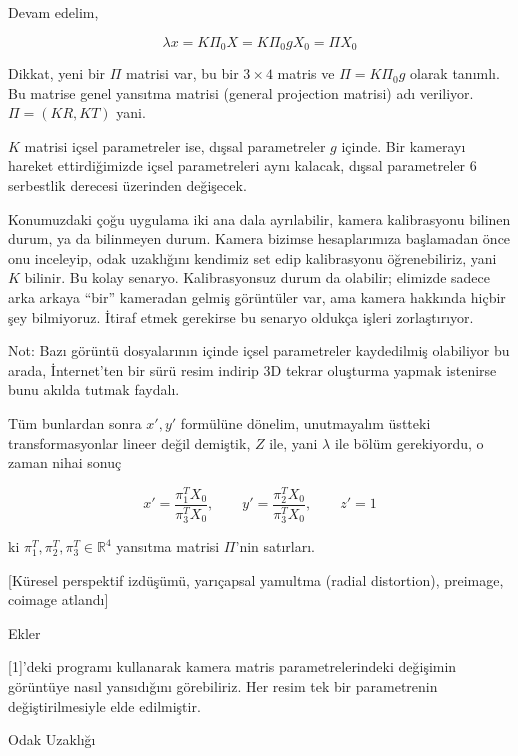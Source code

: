 \documentclass[12pt,fleqn]{article}\usepackage{../../common}
\begin{document}
Devam edelim,

$$ \lambda x = K\Pi_0 X = K \Pi_0 g X_0 = \Pi X_0 $$

Dikkat, yeni bir $\Pi$ matrisi var, bu bir $3 \times 4$ matris ve $\Pi =
K\Pi_0g$ olarak tanımlı. Bu matrise genel yansıtma matrisi (general projection
matrisi) adı veriliyor. $\Pi = (KR, KT)$ yani.

$K$ matrisi içsel parametreler ise, dışsal parametreler $g$ içinde. Bir
kamerayı hareket ettirdiğimizde içsel parametreleri aynı kalacak, dışsal
parametreler 6 serbestlik derecesi üzerinden değişecek.

Konumuzdaki çoğu uygulama iki ana dala ayrılabilir, kamera kalibrasyonu bilinen
durum, ya da bilinmeyen durum. Kamera bizimse hesaplarımıza başlamadan önce onu
inceleyip, odak uzaklığını kendimiz set edip kalibrasyonu öğrenebiliriz, yani
$K$ bilinir. Bu kolay senaryo. Kalibrasyonsuz durum da olabilir; elimizde sadece
arka arkaya ``bir'' kameradan gelmiş görüntüler var, ama kamera hakkında hiçbir
şey bilmiyoruz. İtiraf etmek gerekirse bu senaryo oldukça işleri zorlaştırıyor.

Not: Bazı görüntü dosyalarının içinde içsel parametreler kaydedilmiş
olabiliyor bu arada, İnternet'ten bir sürü resim indirip 3D tekrar
oluşturma yapmak istenirse bunu akılda tutmak faydalı.

Tüm bunlardan sonra $x',y'$ formülüne dönelim, unutmayalım üstteki
transformasyonlar lineer değil demiştik, $Z$ ile, yani $\lambda$ ile bölüm
gerekiyordu, o zaman nihai sonuç

$$ 
x ' = \frac{\pi_1^TX_0}{\pi_3^TX_0}, \qquad
y ' = \frac{\pi_2^TX_0}{\pi_3^TX_0}, \qquad
z' = 1
$$

ki $\pi_1^T,\pi_2^T,\pi_3^T \in \mathbb{R}^4$ yansıtma matrisi $\Pi$'nin satırları. 

[Küresel perspektif izdüşümü, yarıçapsal yamultma (radial distortion),
preimage, coimage atlandı]

Ekler

[1]'deki programı kullanarak kamera matris parametrelerindeki değişimin
görüntüye nasıl yansıdığını görebiliriz. Her resim tek bir parametrenin
değiştirilmesiyle elde edilmiştir. 

Odak Uzaklığı
\end{document}
